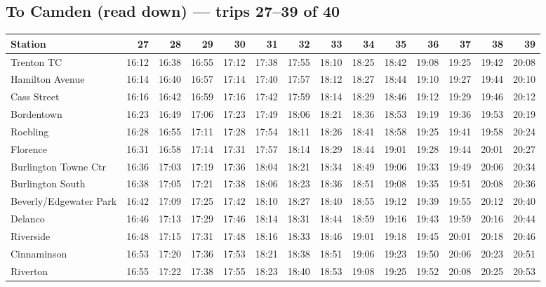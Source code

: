 \subsection*{To Camden (read down) --- trips 27--39 of 40}
\begin{center}\footnotesize\setlength{\tabcolsep}{3pt}\begin{tabular}{@{}lrrrrrrrrrrrrr@{}}\toprule
Station & 27 & 28 & 29 & 30 & 31 & 32 & 33 & 34 & 35 & 36 & 37 & 38 & 39 \\\midrule
Trenton TC & 16:12 & 16:38 & 16:55 & 17:12 & 17:38 & 17:55 & 18:10 & 18:25 & 18:42 & 19:08 & 19:25 & 19:42 & 20:08 \\
Hamilton Avenue & 16:14 & 16:40 & 16:57 & 17:14 & 17:40 & 17:57 & 18:12 & 18:27 & 18:44 & 19:10 & 19:27 & 19:44 & 20:10 \\
Cass Street & 16:16 & 16:42 & 16:59 & 17:16 & 17:42 & 17:59 & 18:14 & 18:29 & 18:46 & 19:12 & 19:29 & 19:46 & 20:12 \\
Bordentown & 16:23 & 16:49 & 17:06 & 17:23 & 17:49 & 18:06 & 18:21 & 18:36 & 18:53 & 19:19 & 19:36 & 19:53 & 20:19 \\
Roebling & 16:28 & 16:55 & 17:11 & 17:28 & 17:54 & 18:11 & 18:26 & 18:41 & 18:58 & 19:25 & 19:41 & 19:58 & 20:24 \\
Florence & 16:31 & 16:58 & 17:14 & 17:31 & 17:57 & 18:14 & 18:29 & 18:44 & 19:01 & 19:28 & 19:44 & 20:01 & 20:27 \\
Burlington Towne Ctr & 16:36 & 17:03 & 17:19 & 17:36 & 18:04 & 18:21 & 18:34 & 18:49 & 19:06 & 19:33 & 19:49 & 20:06 & 20:34 \\
Burlington South & 16:38 & 17:05 & 17:21 & 17:38 & 18:06 & 18:23 & 18:36 & 18:51 & 19:08 & 19:35 & 19:51 & 20:08 & 20:36 \\
Beverly/Edgewater Park & 16:42 & 17:09 & 17:25 & 17:42 & 18:10 & 18:27 & 18:40 & 18:55 & 19:12 & 19:39 & 19:55 & 20:12 & 20:40 \\
Delanco & 16:46 & 17:13 & 17:29 & 17:46 & 18:14 & 18:31 & 18:44 & 18:59 & 19:16 & 19:43 & 19:59 & 20:16 & 20:44 \\
Riverside & 16:48 & 17:15 & 17:31 & 17:48 & 18:16 & 18:33 & 18:46 & 19:01 & 19:18 & 19:45 & 20:01 & 20:18 & 20:46 \\
Cinnaminson & 16:53 & 17:20 & 17:36 & 17:53 & 18:21 & 18:38 & 18:51 & 19:06 & 19:23 & 19:50 & 20:06 & 20:23 & 20:51 \\
Riverton & 16:55 & 17:22 & 17:38 & 17:55 & 18:23 & 18:40 & 18:53 & 19:08 & 19:25 & 19:52 & 20:08 & 20:25 & 20:53 \\

\end{tabular}
\end{center}
